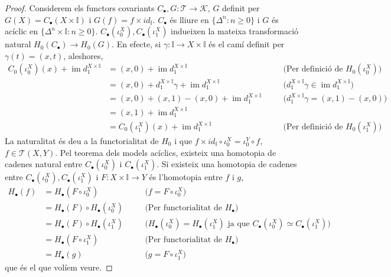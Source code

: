 \documentclass[compress]{article}
\theoremstyle{definition}
\DeclareMathOperator{\im}{im}
\begin{document}
\begin{proof}
    Considerem els functors covariants $C_{\bullet},G:\mathscr{T}\rightarrow\mathscr{K}$, $G$ definit per $G(X)=C_{\bullet}(X\times\mathbb{I})$ i $G(f)=f\times id_{\mathbb{I}}$. $C_{\bullet}$ és lliure en $\{\Delta^{n}:n\geq0\}$ i $G$ és acíclic en $\{\Delta^{n}\times\mathbb{I}:n\geq0\}$. $C_{\bullet}(\iota_{0}^{X}),C_{\bullet}(\iota_{1}^{X})$ indueixen la mateixa transformació natural $H_{0}(C_{\bullet})\rightarrow H_{0}(G)$. En efecte, si $\gamma:\mathbb{I}\rightarrow X\times\mathbb{I}$ és el camí definit per $\gamma(t)=(x,t)$, aleshores,
    \begin{align*}
        C_{0}(\iota_{0}^{X})(x)+\im{d_{1}^{X\times\mathbb{I}}}
        &=(x,0)+\im{d_{1}^{X\times\mathbb{I}}}
        &\quad&\textrm{(Per definició de $H_{0}(\iota_{0}^{X})$)}\\
        &=(x,0)+d_{1}^{X\times\mathbb{I}}\gamma+\im{d_{1}^{X\times\mathbb{I}}}
        &\quad&\textrm{($d_{1}^{X\times\mathbb{I}}\gamma\in\im{d_{1}^{X\times\mathbb{I}}}$)}\\
        &=(x,0)+(x,1)-(x,0)+\im{d_{1}^{X\times\mathbb{I}}}
        &\quad&\textrm{($d_{1}^{X\times\mathbb{I}}\gamma=(x,1)-(x,0)$)}\\
        &=(x,1)+\im{d_{1}^{X\times\mathbb{I}}}\\
        &=C_{0}(\iota_{1}^{X})(x)+\im{d_{1}^{X\times\mathbb{I}}}
        &\quad&\textrm{(Per definició de $H_{0}(\iota_{1}^{X})$)}
    \end{align*}
    La naturalitat és deu a la functorialitat de $H_{0}$ i que $f\times id_{\mathbb{I}}\circ\iota_{0}^{X}=\iota_{0}^{Y}\circ f$, $f\in\mathscr{T}(X,Y)$. Pel teorema dels models acíclics, existeix una homotopia de cadenes natural entre $C_{\bullet}(\iota_{0}^{X})$ i $C_{\bullet}(\iota_{1}^{X})$. Si existeix una homotopia de cadenes entre $C_{\bullet}(\iota_{0}^{X}),C_{\bullet}(\iota_{1}^{X})$ i $F:X\times\mathbb{I}\rightarrow Y$ és l'homotopia entre $f$ i $g$,
    \begin{align*}
        H_{\bullet}(f)
        &=H_{\bullet}(F\circ\iota_{0}^{X})
        &\quad&\textrm{($f=F\circ\iota_{0}^{X}$)}\\
        &=H_{\bullet}(F)\circ H_{\bullet}(\iota_{0}^{X})
        &\quad&\textrm{(Per functorialitat de $H_{\bullet}$)}\\
        &=H_{\bullet}(F)\circ H_{\bullet}(\iota_{1}^{X})
        &\quad&\textrm{($H_{\bullet}(\iota_{0}^{X})=H_{\bullet}(\iota_{1}^{X})$ ja que $C_{\bullet}(\iota_{0}^{X})\simeq C_{\bullet}(\iota_{1}^{X})$)}\\
        &=H_{\bullet}(F\circ\iota_{1}^{X})
        &\quad&\textrm{(Per functorialitat de $H_{\bullet}$)}\\
        &=H_{\bullet}(g)&\quad&\textrm{($g=F\circ\iota_{1}^{X}$)}
    \end{align*}
    que és el que volíem veure.
\end{proof}
\end{document}
